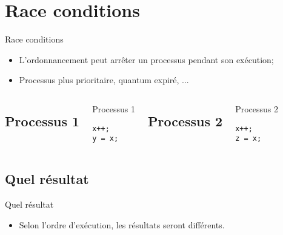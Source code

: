 \def\sectitle{Race conditions}
\section{\sectitle}
\begin{frame}[containsverbatim]{\sectitle}
\begin{block}{\subsectitle}
\begin{itemize}
    \item L'ordonnancement peut arrêter un processus pendant son exécution;
    \item Processus plus prioritaire, quantum expiré, ...
\end{itemize}
\end{block}

\begin{columns}[b]

\def\subsectitle{Processus 1}
\subsection{\subsectitle}
\begin{exampleblock}{\subsectitle}
\begin{verbatim}
x++; 
y = x;
\end{verbatim}
\end{exampleblock}


\def\subsectitle{Processus 2}
\subsection{\subsectitle}
\begin{exampleblock}{\subsectitle}
\begin{verbatim}
x++; 
z = x;
\end{verbatim}
\end{exampleblock}

\end{columns}

\def\subsectitle{Quel résultat}
\subsection{\subsectitle}
\begin{block}{\subsectitle}
\begin{itemize}
    \item Selon l'ordre d'exécution, les résultats seront différents.
\end{itemize}
\end{block}

\end{frame}

